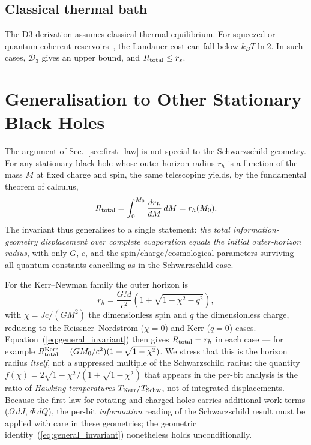 \documentclass[aps,prd,twocolumn,showpacs,preprintnumbers,amsmath,amssymb,longbibliography]{revtex4-2}
\begin{document}
\subsection{Classical thermal bath}

The D3 derivation assumes classical thermal equilibrium. For squeezed or 
quantum-coherent reservoirs~\cite{klaers2019}, the Landauer cost can fall below 
$k_B T \ln 2$. In such cases, $\mathcal{D}_3$ gives an upper bound, and 
$R_{\rm total} \leq r_s$.

\section{Generalisation to Other Stationary Black Holes}
\label{sec:generalisation}

The argument of Sec.~\ref{sec:first_law} is not special to the Schwarzschild
geometry. For any stationary black hole whose outer horizon radius $r_h$ is a
function of the mass $M$ at fixed charge and spin, the same telescoping yields,
by the fundamental theorem of calculus,
\begin{equation}
R_{\rm total} = \int_0^{M_0}\frac{dr_h}{dM}\,dM = r_h(M_0).
\label{eq:general_invariant}
\end{equation}
The invariant thus generalises to a single statement: \emph{the total
information-geometry displacement over complete evaporation equals the initial
outer-horizon radius}, with only $G$, $c$, and the spin/charge/cosmological
parameters surviving --- all quantum constants cancelling as in the
Schwarzschild case.

For the Kerr--Newman family the outer horizon is
\begin{equation}
r_h = \frac{GM}{c^2}\left(1+\sqrt{1-\chi^2-q^2}\right),
\label{eq:kn_horizon}
\end{equation}
with $\chi = Jc/(GM^2)$ the dimensionless spin and $q$ the dimensionless charge,
reducing to the Reissner--Nordstr\"om ($\chi=0$) and Kerr ($q=0$) cases.
Equation~(\ref{eq:general_invariant}) then gives $R_{\rm total} = r_h$ in each
case --- for example $R_{\rm total}^{\rm Kerr} = (GM_0/c^2)(1+\sqrt{1-\chi^2})$.
We stress that this is the horizon radius \emph{itself}, not a suppressed
multiple of the Schwarzschild radius: the quantity
$f(\chi)=2\sqrt{1-\chi^2}/(1+\sqrt{1-\chi^2})$ that appears in the per-bit
analysis is the ratio of \emph{Hawking temperatures} $T_{\rm Kerr}/T_{\rm Schw}$,
not of integrated displacements. Because the first law for rotating and charged
holes carries additional work terms ($\Omega\,dJ$, $\Phi\,dQ$), the per-bit
\emph{information} reading of the Schwarzschild result must be applied with care
in these geometries; the geometric identity~(\ref{eq:general_invariant})
nonetheless holds unconditionally.
\end{document}
